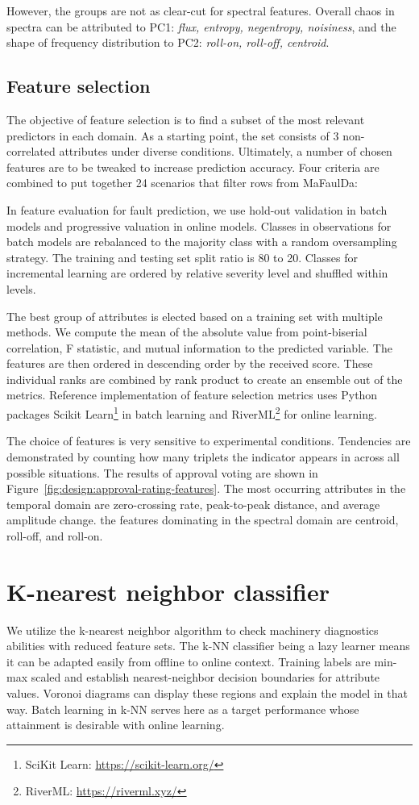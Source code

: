 However, the groups are not as clear-cut for spectral features. Overall chaos in spectra can be attributed to PC1: \emph{flux, entropy, negentropy, noisiness}, and the shape of frequency distribution to PC2: \emph{roll-on, roll-off, centroid}.


\subsection{Feature selection}
The objective of feature selection is to find a subset of the most relevant predictors in each domain. As a starting point, the set consists of 3 non-correlated attributes under diverse conditions. Ultimately, a number of chosen features are to be tweaked to increase prediction accuracy. Four criteria are combined to put together 24 scenarios that filter rows from MaFaulDa:


In feature evaluation for fault prediction, we use hold-out validation in batch models and progressive valuation in online models. Classes in observations for batch models are rebalanced to the majority class with a random oversampling strategy. The training and testing set split ratio is 80 to 20. Classes for incremental learning are ordered by relative severity level and shuffled within levels. 

The best group of attributes is elected based on a training set with multiple methods. We compute the mean of the absolute value from point-biserial correlation, F statistic, and mutual information to the predicted variable. The features are then ordered in descending order by the received score. These individual ranks are combined by rank product to create an ensemble out of the metrics. Reference implementation of feature selection metrics uses Python packages Scikit Learn\footnote{SciKit Learn: \url{https://scikit-learn.org/}} in batch learning and RiverML\footnote{RiverML: \url{https://riverml.xyz/}} for online learning.


The choice of features is very sensitive to experimental conditions. Tendencies are demonstrated by counting how many triplets the indicator appears in across all possible situations. The results of approval voting are shown in Figure~\ref{fig:design:approval-rating-features}. The most occurring attributes in the temporal domain are zero-crossing rate, peak-to-peak distance, and average amplitude change. the features dominating in the spectral domain are centroid, roll-off, and roll-on.


\section{K-nearest neighbor classifier}
We utilize the k-nearest neighbor algorithm to check machinery diagnostics abilities with reduced feature sets. The k-NN classifier being a lazy learner means it can be adapted easily from offline to online context. Training labels are min-max scaled and establish nearest-neighbor decision boundaries for attribute values. Voronoi diagrams can display these regions and explain the model in that way. Batch learning in k-NN serves here as a target performance whose attainment is desirable with online learning.

